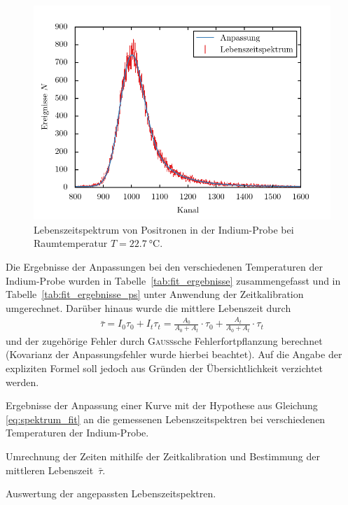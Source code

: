 \documentclass[11pt, a4paper]{article}
\numberwithin{equation}{section}
\begin{document}
\begin{figure}[h]
	\centering
	\includegraphics{./figures/lifetimes/raumtemperatur.pdf}
	\caption{Lebenszeitspektrum von Positronen in der Indium-Probe bei Raumtemperatur $T = \SI{22.7}{\degreeCelsius}$.}
	\label{fig:fit_lebenszeitspektrum}
\end{figure}
Die Ergebnisse der Anpassungen bei den verschiedenen Temperaturen der Indium-Probe wurden in Tabelle~\ref{tab:fit_ergebnisse} zusammengefasst und in Tabelle~\ref{tab:fit_ergebnisse_ps} unter Anwendung der Zeitkalibration umgerechnet.
Darüber hinaus wurde die mittlere Lebenszeit durch \cite{add_infos}
\begin{align*}
	\bar{\tau} = I_0 \tau_0 + I_t \tau_t = \frac{A_0}{A_0 + A_t} \cdot \tau_0 + \frac{A_t}{A_0 + A_t} \cdot \tau_t
\end{align*}
und der zugehörige Fehler durch \textsc{Gauß}sche Fehlerfortpflanzung berechnet (Kovarianz der Anpassungsfehler wurde hierbei beachtet).
Auf die Angabe der expliziten Formel soll jedoch aus Gründen der Übersichtlichkeit verzichtet werden.
\begin{table}
	\begin{subtable}{\textwidth}
		\centering
		\resizebox{\textwidth}{!}{
			
		}
		\caption{Ergebnisse der Anpassung einer Kurve mit der Hypothese aus Gleichung \eqref{eq:spektrum_fit} an die gemessenen Lebenszeitspektren bei verschiedenen Temperaturen der Indium-Probe.}
		\label{tab:fit_ergebnisse}
		\vspace*{0.8cm}
	\end{subtable}
	\begin{subtable}{\textwidth}
		\centering
		
		\caption{Umrechnung der Zeiten mithilfe der Zeitkalibration und Bestimmung der mittleren Lebenszeit~$\bar{\tau}$.}
		\label{tab:fit_ergebnisse_ps}
		\vspace*{0.5cm}
	\end{subtable}
	\caption{Auswertung der angepassten Lebenszeitspektren.}
\end{table}
\end{document}
